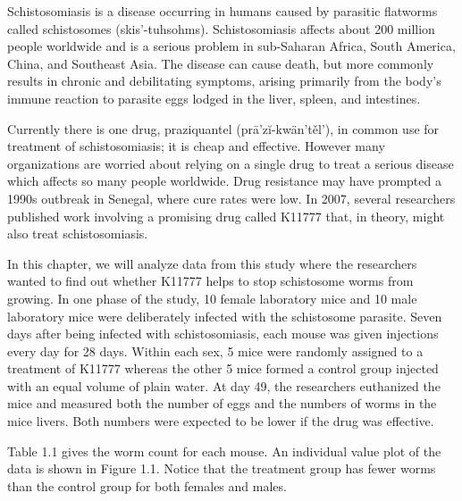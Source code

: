 \documentclass[
]{book}
\begin{document}
Schistosomiasis is a disease occurring in humans caused by parasitic flatworms called schistosomes (skis'-tuhsohms). Schistosomiasis affects about 200 million people worldwide and is a serious problem in sub-Saharan Africa, South America, China, and Southeast Asia. The disease can cause death, but more commonly results in chronic and debilitating symptoms, arising primarily from the body's immune reaction to parasite eggs lodged in the liver, spleen, and intestines.

Currently there is one drug, praziquantel (prā'zĭ-kwän'těl'), in common use for treatment of schistosomiasis; it is cheap and effective. However many organizations are worried about relying on a single drug to treat a serious disease which affects so many people worldwide. Drug resistance may have prompted a 1990s outbreak in Senegal, where cure rates were low. In 2007, several researchers published work involving a promising drug called K11777 that, in theory, might also treat schistosomiasis.

In this chapter, we will analyze data from this study where the researchers wanted to find out whether K11777 helps to stop schistosome worms from growing. In one phase of the study, 10 female laboratory mice and 10 male laboratory mice were deliberately infected with the schistosome parasite. Seven days after being infected with schistosomiasis, each mouse was given injections every day for 28 days. Within each sex, 5 mice were randomly assigned to a treatment of K11777 whereas the other 5 mice formed a control group injected with an equal volume of plain water. At day 49, the researchers euthanized the mice and measured both the number of eggs and the numbers of worms in the mice livers. Both numbers were expected to be lower if the drug was effective.

Table 1.1 gives the worm count for each mouse. An individual value plot of the data is shown in Figure 1.1. Notice that the treatment group has fewer worms than the control group for both females and males.
\end{document}
